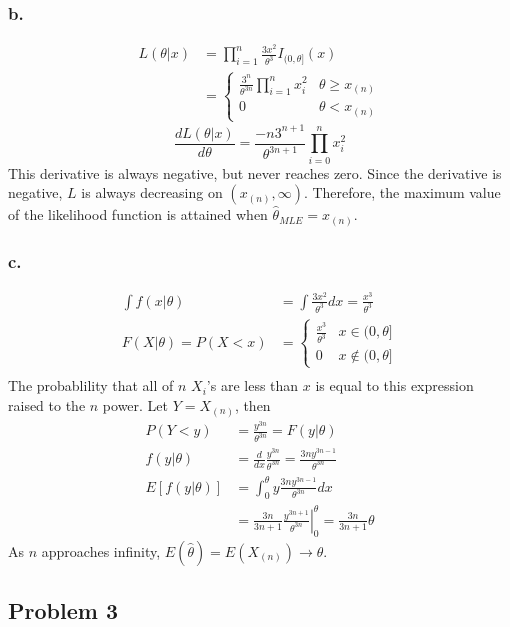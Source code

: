 \documentclass{article}
\begin{document}
\subsubsection*{b.}
\begin{align*}
L(\theta|x) &= \prod_{i=1}^n\frac{3x^2}{\theta^3}I_{(0,\theta]}(x) \\
&=\begin{cases} \frac{3^n}{\theta^{3n}}\prod_{i=1}^n x_i^2 & \theta \geq x_{(n)} \\ 0 & \theta < x_{(n)} \end{cases}
\end{align*}
\[\frac{dL(\theta|x)}{d\theta} = \frac{-n3^{n+1}}{\theta^{3n+1}}\prod_{i=0}^n x_i^2\]
This derivative is always negative, but never reaches zero. Since the derivative is negative, $L$ is always decreasing on $(x_{(n)}, \infty)$. Therefore, the maximum value of the likelihood function is attained when $\hat{\theta}_{MLE} = x_{(n)}$.
\subsubsection*{c.}
\begin{align*}
\int f(x|\theta) &= \int \frac{3x^2}{\theta^3}dx = \frac{x^3}{\theta^3}\\
F(X|\theta)= P(X < x)&= \begin{cases}\frac{x^3}{\theta^3} &x \in (0,\theta] \\ 0 & x \notin (0,\theta]\end{cases}  \\
\end{align*}
The probablility that all of $n$ $X_i$'s are less than $x$ is equal to this expression raised to the $n$ power. Let $Y = X_{(n)}$, then 
\begin{align*}
P(Y < y) &= \frac{y^{3n}}{\theta^{3n}} = F(y|\theta) \\
f(y|\theta) &= \frac{d}{dx}\frac{y^{3n}}{\theta^{3n}} = \frac{3ny^{3n-1}}{\theta^{3n}} \\
E\left[f(y|\theta)\right] &= \int_0^\theta y\frac{3ny^{3n-1}}{\theta^{3n}}dx \\
&= \frac{3n}{3n+1}\left.\frac{y^{3n+1}}{\theta^{3n}}\right|^\theta_0 = \frac{3n}{3n+1}\theta
\end{align*}
As $n$ approaches infinity, $E(\hat{\theta}) = E(X_{(n)}) \to \theta$. 

\subsection*{Problem 3}
\end{document}
